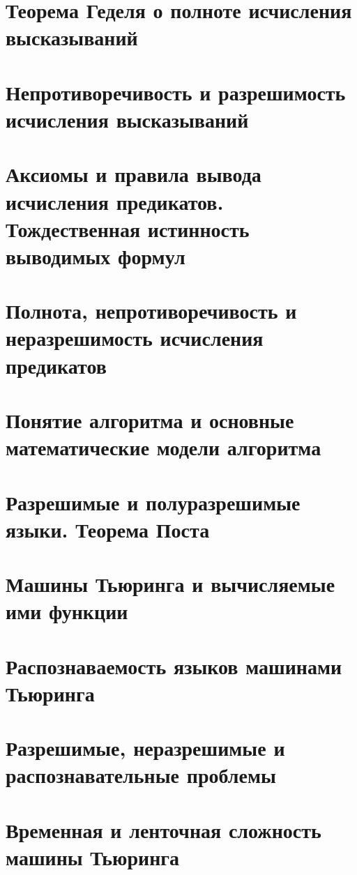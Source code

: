 \documentclass{Exams}
\begin{document}
\section{Теорема Геделя о полноте исчисления высказываний}


\section{Непротиворечивость и разрешимость исчисления высказываний}


\section{Аксиомы и правила вывода исчисления предикатов. Тождественная истинность выводимых формул}


\section{Полнота, непротиворечивость и неразрешимость исчисления предикатов}


\section{Понятие алгоритма и основные математические модели алгоритма}


\section{Разрешимые и полуразрешимые языки. Теорема Поста}


\section{Машины Тьюринга и вычисляемые ими функции}


\section{Распознаваемость языков машинами Тьюринга}


\section{Разрешимые, неразрешимые и распознавательные проблемы}


\section{Временная и ленточная сложность машины Тьюринга}

\end{document}
